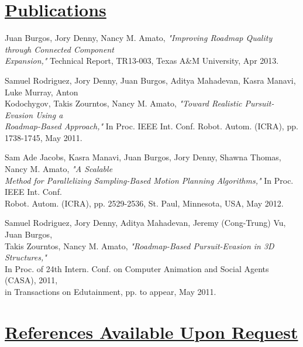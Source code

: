 \documentclass[8pt]{res}
\begin{document}
\begin{resume}
    \section{\underline{Publications}}
    Juan Burgos, Jory Denny, Nancy M. Amato, \emph{"Improving Roadmap Quality through Connected Component \\
    Expansion,"} Technical Report, TR13-003, Texas A\&M University, Apr 2013.

    Samuel Rodriguez, Jory Denny, Juan Burgos, Aditya Mahadevan, Kasra Manavi, Luke Murray, Anton \\
    Kodochygov, Takis Zourntos, Nancy M. Amato, \emph{"Toward Realistic Pursuit-Evasion Using a \\
    Roadmap-Based Approach,"} In Proc. IEEE Int. Conf. Robot. Autom. (ICRA), pp. 1738-1745, May 2011. 

    Sam Ade Jacobs, Kasra Manavi, Juan Burgos, Jory Denny, Shawna Thomas, Nancy M. Amato, \emph{"A Scalable \\
    Method for Parallelizing Sampling-Based Motion Planning Algorithms,"} In Proc. IEEE Int. Conf. \\
    Robot. Autom. (ICRA), pp. 2529-2536, St. Paul, Minnesota, USA, May 2012. 

    Samuel Rodriguez, Jory Denny, Aditya Mahadevan, Jeremy (Cong-Trung) Vu, Juan Burgos, \\
    Takis Zourntos, Nancy M. Amato, \emph{"Roadmap-Based Pursuit-Evasion in 3D Structures,"} \\
    In Proc. of 24th Intern. Conf. on Computer Animation and Social Agents (CASA), 2011, \\
    in Transactions on Edutainment, pp. to appear, May 2011.


    \section{\underline{References Available Upon Request}}


  \end{resume}
\end{document}
